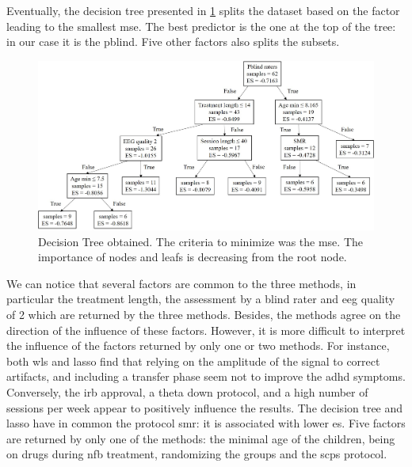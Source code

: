 Eventually, the decision tree presented in \cref{Figure:factors_analysis_decision_tree_results} splits the dataset based on the factor leading to the
smallest \gls{mse}. The best predictor is the one at the top of the tree: in our case it is the \gls{pblind}. Five other factors also splits the subsets. 

\begin{figure}[h!]
  \centering
  \includegraphics[width=1.0\linewidth]{figures/factors_analysis_decision_tree_results_no_colors_2-columns_fitting_image}
  \caption{Decision Tree obtained. The criteria to minimize was the \gls{mse}. The importance of nodes and leafs is decreasing
	from the root node.}
  \label{Figure:factors_analysis_decision_tree_results}
\end{figure}

We can notice that several factors are common to the three methods, in particular the treatment length, the assessment 
by a blind rater and \gls{eeg} quality of 2 which are returned by the three methods. Besides, 
the methods agree on the direction of the influence of these factors. However, it is more difficult to interpret the influence of the factors 
returned by only one or two methods. For instance, both \gls{wls} and \gls{lasso} find that  
relying on the amplitude of the signal to correct artifacts, and including a transfer phase seem not to improve the \gls{adhd} symptoms. 
Conversely, the \gls{irb} approval, a theta down protocol, and a high number of sessions per week appear to 
positively influence the results. The decision tree and \gls{lasso} have in common the protocol \gls{smr}: it is associated with lower \gls{es}.
Five factors are returned by only one of the methods: the minimal age of the children, being on drugs 
during \gls{nfb} treatment, randomizing the groups and the \glspl{scp} protocol. 



